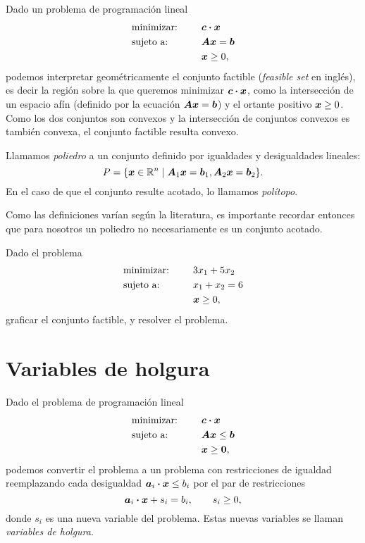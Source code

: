 Dado un problema de programación lineal
\begin{alignat*}{2}
  & \text{minimizar: } & & \bm{c} \boldsymbol{\cdot} \bm{x} \\
   & \text{sujeto a: } & \quad & \bm{A}\bm{x} = \bm{b} \\
   & & & \bm{x} \ge 0,
\end{alignat*}
podemos interpretar geom\'etricamente el conjunto factible (\emph{feasible set} en ingl\'es), es decir la regi\'on sobre la que queremos minimizar $\bm{c} \boldsymbol{\cdot} \bm{x}$, como la intersecci\'on de un espacio af\'in (definido por la ecuaci\'on $\bm{A}\bm{x} = \bm{b}$) y el ortante positivo $\bm{x} \ge 0$. Como los dos conjuntos son convexos y la intersecci\'on de conjuntos convexos es tambi\'en convexa, el conjunto factible resulta convexo.

\begin{definition}
Llamamos \emph{poliedro} a un conjunto definido por igualdades y desigualdades lineales:
$$
P = \{\bm{x} \in \mathbb{R}^n \mid \bm{A}_1 \bm{x} = \bm{b}_1, \bm{A}_2 \bm{x} = \bm{b}_2\}.
$$
En el caso de que el conjunto resulte acotado, lo llamamos \emph{pol\'itopo}.
\end{definition}

Como las definiciones var\'ian seg\'un la literatura, es importante recordar entonces que para nosotros un poliedro no  necesariamente es un conjunto acotado.

\begin{ejercicio}
Dado el problema
\begin{alignat*}{2}
  & \text{minimizar: } & & 3 x_1 + 5 x_2 \\
   & \text{sujeto a: } & \quad & x_1 + x_2 = 6 \\
   & & & \bm{x} \ge 0,
\end{alignat*}
graficar el conjunto factible, y resolver el problema.
\end{ejercicio}

\section{Variables de holgura}

Dado el problema de programación lineal
\begin{alignat*}{2}
  & \text{minimizar: } & & \bm{c} \boldsymbol{\cdot} \bm{x} \\
   & \text{sujeto a: } & \quad & \bm{A}\bm{x} \le \bm{b} \\
   & & & \bm{x} \ge \bm{0},
\end{alignat*}
podemos convertir el problema a un problema con restricciones de igualdad reemplazando cada desigualdad $\bm{a}_i \boldsymbol{\cdot} \bm{x} \le b_i$ por el par de  restricciones
$$\bm{a}_i \boldsymbol{\cdot} \bm{x} + s_i =  b_i, \quad \quad s_i \ge 0,$$
donde $s_i$ es una nueva variable del problema. Estas nuevas variables se llaman \emph{variables de holgura}.

